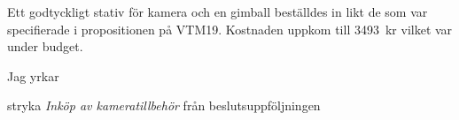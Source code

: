 \documentclass[../_main/handlingar.tex]{subfiles}
\begin{document}

    Ett godtyckligt stativ för kamera och en gimball beställdes in likt de som var specifierade i propositionen på VTM19. Kostnaden uppkom till \SI{3493}{kr} vilket var under budget. 


    Jag yrkar 
\begin{attsatser}
    \att stryka \emph{Inköp av kameratillbehör} från beslutsuppföljningen
\end{attsatser}

\begin{signatures}{1}
    \signature{Sonja Kenari}{}
\end{signatures}
\end{document}
